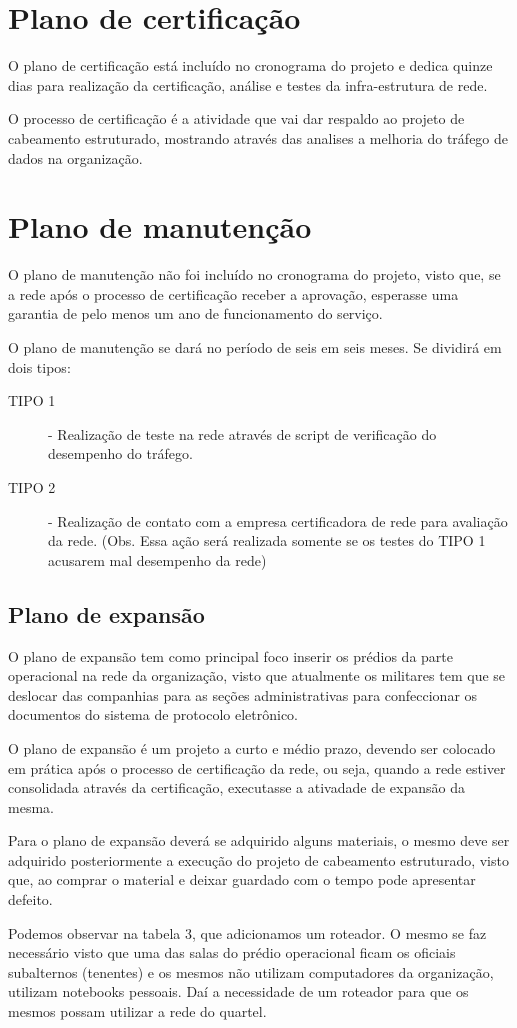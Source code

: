\documentclass[12pt, a4paper]{article}
\begin{document}
	\section{Plano de certificação}
	O plano de certificação está incluído no cronograma do projeto e dedica quinze dias para realização da certificação, análise e testes da infra-estrutura de rede.
	\par 
	O processo de certificação é a atividade que vai dar respaldo ao projeto de cabeamento estruturado, mostrando através das analises a melhoria do tráfego de dados na organização.
	
	\section{Plano de manutenção}
	O plano de manutenção não foi incluído no cronograma do projeto, visto que, se a rede após o processo de certificação receber a aprovação, esperasse uma garantia de pelo menos um ano de funcionamento do serviço.
	\par 
	O plano de manutenção se dará no período de seis em seis meses. Se dividirá em dois tipos:
	\begin{description}
		\item[TIPO 1] - Realização de teste na rede através de script de verificação do desempenho do tráfego.
		\item[TIPO 2] - Realização de contato com a empresa certificadora de rede para avaliação da rede. (Obs. Essa ação será realizada somente se os testes do TIPO 1 acusarem mal desempenho da rede)
	\end{description}
	\subsection{Plano de expansão}
	O plano de expansão tem como principal foco inserir os prédios da parte operacional na rede da organização, visto que atualmente os militares tem que se deslocar das companhias para as seções administrativas para confeccionar os documentos do sistema de protocolo eletrônico.
	\par 
	O plano de expansão é um projeto a curto e médio prazo, devendo ser colocado em prática após o processo de certificação da rede, ou seja, quando a rede estiver consolidada através da certificação, executasse a ativadade de expansão da mesma.
	\par 
	Para o plano de expansão deverá se adquirido alguns materiais, o mesmo deve ser adquirido posteriormente a execução do projeto de cabeamento estruturado, visto que, ao comprar o material e deixar guardado com o tempo pode apresentar defeito.
	\FloatBarrier
	
	\FloatBarrier	
	Podemos observar na tabela 3, que adicionamos um roteador. O mesmo se faz necessário visto que uma das salas do prédio operacional ficam os oficiais subalternos (tenentes) e os mesmos não utilizam computadores da organização, utilizam notebooks pessoais. Daí a necessidade de um roteador para que os mesmos possam utilizar a rede do quartel.
\end{document}
